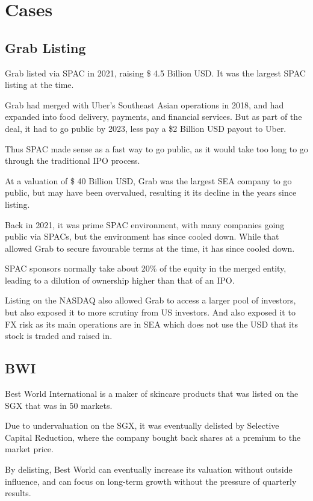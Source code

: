 \section{Cases}
\subsection{Grab Listing}
Grab listed via SPAC in 2021, raising \$ 4.5 Billion USD. It was the largest SPAC listing at the time.

Grab had merged with Uber's Southeast Asian operations in 2018, and had expanded into food delivery, payments, and financial services. But as part of the deal, it had to go public by 2023, less pay a \$2 Billion USD payout to Uber.

Thus SPAC made sense as a fast way to go public, as it would take too long to go through the traditional IPO process.

At a valuation of \$ 40 Billion USD, Grab was the largest SEA company to go public, but may have been overvalued, resulting it its decline in the years since listing.

Back in 2021, it was prime SPAC environment, with many companies going public via SPACs, but the environment has since cooled down. While that allowed Grab to secure favourable terms at the time, it has since cooled down.

SPAC sponsors normally take about 20\% of the equity in the merged entity, leading to a dilution of ownership higher than that of an IPO.

Listing on the NASDAQ also allowed Grab to access a larger pool of investors, but also exposed it to more scrutiny from US investors. And also exposed it to FX risk as its main operations are in SEA which does not use the USD that its stock is traded and raised in.

\subsection{BWI}
Best World International is a maker of skincare products that was listed on the SGX that was in 50 markets.

Due to undervaluation on the SGX, it was eventually delisted by Selective Capital Reduction, where the company bought back shares at a premium to the market price.

By delisting, Best World can eventually increase its valuation without outside influence, and can focus on long-term growth without the pressure of quarterly results.

